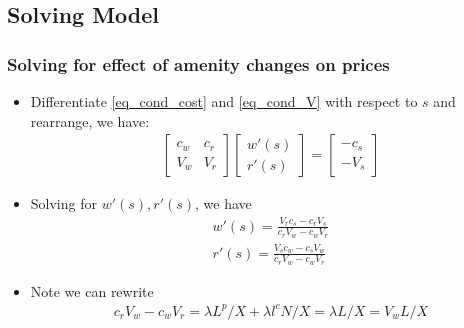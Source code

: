 \documentclass[10pt,notes=hide]{beamer}
\begin{document}
\subsection{Solving Model}
\begin{frame}
\frametitle{Solving for effect of amenity changes on prices}
\begin{itemize}
\item Differentiate \eqref{eq_cond_cost} and \eqref{eq_cond_V} with respect to $s$ and rearrange, we have:
\begin{align*}
\begin{bmatrix}
c_w & c_r \\
V_w & V_r
\end{bmatrix}
\begin{bmatrix}
w'(s) \\
r'(s)
\end{bmatrix} = 
\begin{bmatrix}
-c_s\\
-V_s
\end{bmatrix}
\end{align*}
\item Solving for $w'(s), r'(s)$, we have
\begin{align*}
w'(s) = \frac{V_r c_s - c_r V_s}{c_r V_w - c_w V_r} \\
r'(s) = \frac{V_s c_w - c_s V_w}{c_r V_w - c_w V_r} 
\end{align*}
\item Note we can rewrite
\begin{align*}
c_r V_w - c_w V_r = \lambda L^p/X + \lambda l^c N/X = \lambda L/X =V_w L/X
\end{align*}
\end{itemize}
\end{frame}
\end{document}
